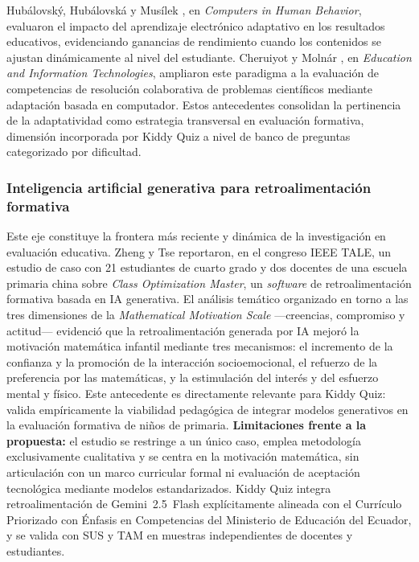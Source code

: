 Hubálovský, Hubálovská y Musílek \cite{hubalovsky2019adaptive}, en \textit{Computers in Human Behavior}, evaluaron el impacto del aprendizaje electrónico adaptativo en los resultados educativos, evidenciando ganancias de rendimiento cuando los contenidos se ajustan dinámicamente al nivel del estudiante. Cheruiyot y Molnár \cite{cheruiyot2026collaborative}, en \textit{Education and Information Technologies}, ampliaron este paradigma a la evaluación de competencias de resolución colaborativa de problemas científicos mediante adaptación basada en computador. Estos antecedentes consolidan la pertinencia de la adaptatividad como estrategia transversal en evaluación formativa, dimensión incorporada por Kiddy Quiz a nivel de banco de preguntas categorizado por dificultad.

\subsubsection{Inteligencia artificial generativa para retroalimentación formativa}

Este eje constituye la frontera más reciente y dinámica de la investigación en evaluación educativa. Zheng y Tse \cite{zheng2023genai} reportaron, en el congreso IEEE TALE, un estudio de caso con 21 estudiantes de cuarto grado y dos docentes de una escuela primaria china sobre \textit{Class Optimization Master}, un \textit{software} de retroalimentación formativa basada en IA generativa. El análisis temático organizado en torno a las tres dimensiones de la \textit{Mathematical Motivation Scale} ---creencias, compromiso y actitud--- evidenció que la retroalimentación generada por IA mejoró la motivación matemática infantil mediante tres mecanismos: el incremento de la confianza y la promoción de la interacción socioemocional, el refuerzo de la preferencia por las matemáticas, y la estimulación del interés y del esfuerzo mental y físico. Este antecedente es directamente relevante para Kiddy Quiz: valida empíricamente la viabilidad pedagógica de integrar modelos generativos en la evaluación formativa de niños de primaria. \textbf{Limitaciones frente a la propuesta:} el estudio se restringe a un único caso, emplea metodología exclusivamente cualitativa y se centra en la motivación matemática, sin articulación con un marco curricular formal ni evaluación de aceptación tecnológica mediante modelos estandarizados. Kiddy Quiz integra retroalimentación de Gemini~2.5~Flash explícitamente alineada con el Currículo Priorizado con Énfasis en Competencias del Ministerio de Educación del Ecuador, y se valida con SUS y TAM en muestras independientes de docentes y estudiantes.


